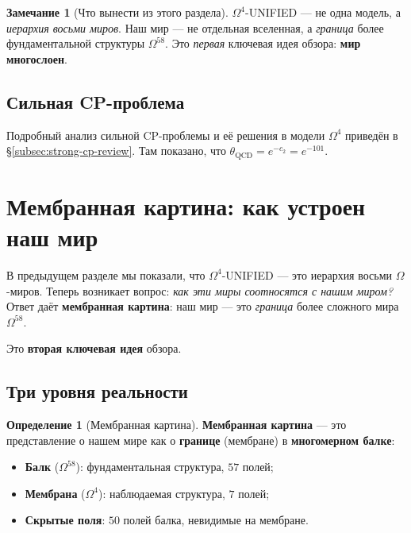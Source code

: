 \documentclass[11pt,a4paper]{article}
\newcommand{\Om}{\Omega^4}
\newcommand{\Omfi}{\Omega^{58}}
\theoremstyle{definition}
\newtheorem{definition}[theorem]{Определение}
\newtheorem{remark}[theorem]{Замечание}
\begin{document}
\begin{remark}[Что вынести из этого раздела]
\label{rem:worlds-takeaway}
$\Om$-UNIFIED — не одна модель, а \emph{иерархия восьми миров}. 
Наш мир — не отдельная вселенная, а \emph{граница} более 
фундаментальной структуры $\Omfi$. Это \emph{первая} ключевая 
идея обзора: \textbf{мир многослоен}.
\end{remark}

\subsection{Сильная CP-проблема}
\label{subsec:strong-cp-review-link}

Подробный анализ сильной CP-проблемы и её решения в модели $\Om$
приведён в §\ref{subsec:strong-cp-review}.
Там показано, что $\theta_{\text{QCD}} = e^{-c_2} = e^{-101}$.

\section{Мембранная картина: как устроен наш мир}
\label{sec:membrane}

В предыдущем разделе мы показали, что $\Om$-UNIFIED — это 
иерархия восьми $\Omega$-миров. Теперь возникает вопрос: 
\emph{как эти миры соотносятся с нашим миром?} Ответ даёт 
\textbf{мембранная картина}: наш мир — это \emph{граница} 
более сложного мира $\Omfi$.

Это \textbf{вторая ключевая идея} обзора.

\subsection{Три уровня реальности}
\label{subsec:three-levels}

\begin{definition}[Мембранная картина]
\label{def:membrane-picture}
\textbf{Мембранная картина} — это представление о нашем мире 
как о \textbf{границе} (мембране) в \textbf{многомерном балке}:
\begin{itemize}
    \item \textbf{Балк} ($\Omfi$): фундаментальная структура, 
          $57$ полей;
    \item \textbf{Мембрана} ($\Om$): наблюдаемая структура, 
          $7$ полей;
    \item \textbf{Скрытые поля}: $50$ полей балка, невидимые 
          на мембране.
\end{itemize}
\end{definition}
\end{document}
